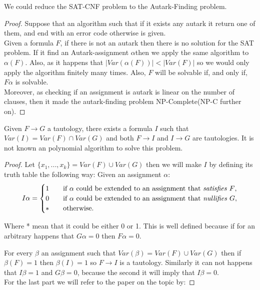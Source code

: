 \begin{proposition} We could reduce the SAT-CNF problem to the Autark-Finding problem.
\begin{proof} Suppose that an algorithm such that if it exists any autark it return one of them, and end with an error code otherwise is given.  \\

Given a formula $F$, if there is not an autark then there is no solution for the SAT problem. If it find an Autark-assignment $\alpha$then we apply the same algorithm to $\alpha(F)$. Also, as it happens that $|Var(\alpha(F))|<|Var(F)|$ so we would only apply the algorithm finitely many times. Also, $F$ will be solvable if, and only if, $F\alpha$ is solvable.	\\

Moreover, as checking if an assignment is autark is linear on the number of clauses, then it made the autark-finding problem NP-Complete(NP-C further on).
\end{proof}
	
\end{proposition}



\begin{proposition}
	Given $F \to G$ a tautology, there exists a formula $I$ such that $Var(I) = Var(F)\cap Var(G)$ and both $F\to I$ and $I \to G$ are tautologies. It is not known an polynomial algorithm to solve this problem. 
\end{proposition}

\begin{proof} Let $\{x_1,...,x_k\} = Var(F)\cup Var(G)$ then we will make $I$ by defining its truth table the following way: Given an assignment $\alpha$:
\[   
I\alpha = 
     \begin{cases}
       1&\quad\text{if $\alpha$ could be extended to an assignment that \emph{satisfies} $F$}, \\
       0&\quad\text{if $\alpha$ could be extended to an assignment that \emph{nullifies} $G$},\\
     * &\quad\text{otherwise.} \\ 
     \end{cases}
\]

Where * mean that it could be either 0 or 1.  This is well defined because if for an arbitrary happens that $G\alpha = 0$ then $F\alpha = 0$.

For every $\beta$ an assignment such that $Var(\beta) = Var(F)\cup Var(G)$ then if $\beta(F) = 1$ then $\beta(I) = 1$ so $F \to I$  is a tautology. Similarly it can not happens that $I\beta = 1 $ and $G\beta = 0$, because the second it will imply that   $I\beta = 0$.\\

For the last part we will refer to the paper on the topic by: 



\end{proof}



